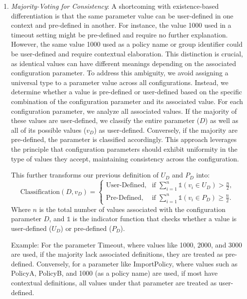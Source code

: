 \begin{enumerate}
\item \textit{Majority-Voting for Consistency}: A shortcoming with existence-based differentiation is that the same parameter value can be user-defined in one context and pre-defined in another. For instance, the value 1000 used in a timeout setting might be pre-defined and require no further explanation. However, the same value 1000 used as a policy name or group identifier could be user-defined and require contextual elaboration. This distinction is crucial, as identical values can have different meanings depending on the associated configuration parameter. To address this ambiguity, we avoid assigning a universal type to a parameter value across all configurations. Instead, we determine whether a value is pre-defined or user-defined based on the specific combination of the configuration parameter and its associated value. For each configuration parameter, we analyze all associated values. If the majority of these values are user-defined, we classify the entire parameter (\(D\)) as well as all of its possible values (\(v_D\)) as user-defined. Conversely, if the majority are pre-defined, the parameter is classified accordingly. This approach leverages the principle that configuration parameters should exhibit uniformity in the type of values they accept, maintaining consistency across the configuration.

This further transforms our previous definition of \(U_D\) and \(P_D\) into:
\[
\text{Classification}(D, v_D) = 
\begin{cases} 
\text{User-Defined}, & \text{if } \sum_{i=1}^{n} \mathbb{1}(v_i \in U_D) > \frac{n}{2}, \\
\text{Pre-Defined}, & \text{if } \sum_{i=1}^{n} \mathbb{1}(v_i \in P_D) \geq \frac{n}{2}.
\end{cases}
\]
Where \( n \) is the total number of values associated with the configuration parameter \( D \), and \( \mathbb{1} \) is the indicator function that checks whether a value is user-defined (\( U_D \)) or pre-defined (\( P_D \)).


Example: For the parameter Timeout, where values like 1000, 2000, and 3000 are used, if the majority lack associated definitions, they are treated as pre-defined. Conversely, for a parameter like ImportPolicy, where values such as PolicyA, PolicyB, and 1000 (as a policy name) are used, if most have contextual definitions, all values under that parameter are treated as user-defined.
\end{enumerate}

